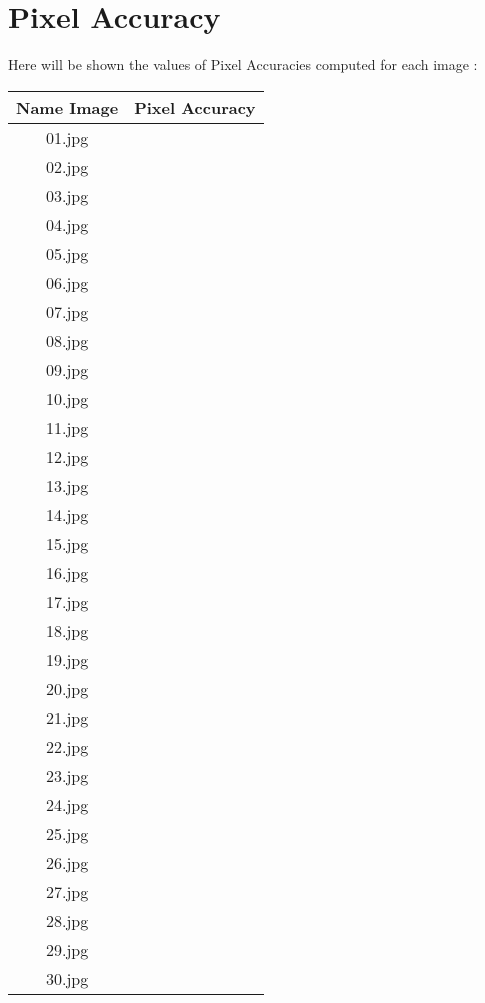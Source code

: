 \section{Pixel Accuracy}
\noindent
Here will be shown the values of Pixel Accuracies computed for each image :
    \begin{longtable}{|c|c|}\hline
        Name Image & Pixel Accuracy\\\hline
        01.jpg & \\\hline
        02.jpg & \\\hline
        03.jpg & \\\hline
        04.jpg & \\\hline
        05.jpg & \\\hline
        06.jpg & \\\hline
        07.jpg & \\\hline
        08.jpg & \\\hline
        09.jpg & \\\hline
        10.jpg & \\\hline
        11.jpg & \\\hline
        12.jpg & \\\hline
        13.jpg & \\\hline
        14.jpg & \\\hline
        15.jpg & \\\hline
        16.jpg & \\\hline
        17.jpg & \\\hline
        18.jpg & \\\hline
        19.jpg & \\\hline
        20.jpg & \\\hline
        21.jpg & \\\hline
        22.jpg & \\\hline
        23.jpg & \\\hline
        24.jpg & \\\hline
        25.jpg & \\\hline
        26.jpg & \\\hline
        27.jpg & \\\hline
        28.jpg & \\\hline
        29.jpg & \\\hline
        30.jpg & \\\hline
    \end{longtable}    
